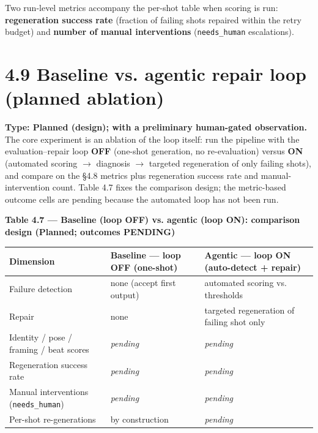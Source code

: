 \documentclass[10pt,twocolumn,letterpaper]{article}
\begin{document}
Two run-level metrics accompany the per-shot table when scoring is run: \textbf{regeneration success rate} (fraction of failing shots repaired within the retry budget) and \textbf{number of manual interventions} (\texttt{needs\_human} escalations).

\section*{4.9 Baseline vs. agentic repair loop (planned ablation)}

\textbf{Type: Planned (design); with a preliminary human-gated observation.} The core experiment is an ablation of the loop itself: run the pipeline with the evaluation--repair loop \textbf{OFF} (one-shot generation, no re-evaluation) versus \textbf{ON} (automated scoring $\rightarrow$ diagnosis $\rightarrow$ targeted regeneration of only failing shots), and compare on the \S{}4.8 metrics plus regeneration success rate and manual-intervention count. Table 4.7 fixes the comparison design; the metric-based outcome cells are pending because the automated loop has not been run.

\begin{table}[t]
\centering
{\footnotesize\textbf{\textbf{Table 4.7 --- Baseline (loop OFF) vs. agentic (loop ON): comparison design (Planned; outcomes PENDING)}}}\par\vspace{3pt}
\footnotesize
\begin{tabularx}{\textwidth}{>{\RaggedRight\arraybackslash}X>{\RaggedRight\arraybackslash}X>{\RaggedRight\arraybackslash}X}
\toprule
Dimension & Baseline --- loop OFF (one-shot) & Agentic --- loop ON (auto-detect + repair) \\
\midrule
Failure detection & none (accept first output) & automated scoring vs. thresholds \\
Repair & none & targeted regeneration of failing shot only \\
Identity / pose / framing / beat scores & \emph{pending} & \emph{pending} \\
Regeneration success rate & \emph{pending} & \emph{pending} \\
Manual interventions (\texttt{needs\_human}) & \emph{pending} & \emph{pending} \\
Per-shot re-generations & 0 by construction & \emph{pending} \\
\bottomrule
\end{tabularx}
\end{table}
\end{document}
